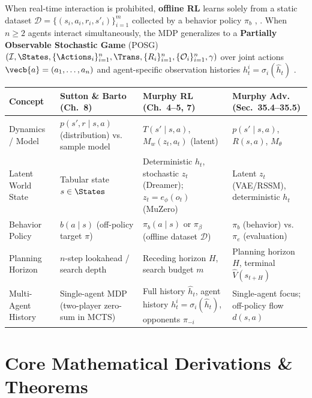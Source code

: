 \documentclass[../../../../master.tex]{subfiles}
\begin{document}
When real-time interaction is prohibited, \textbf{offline RL} learns solely from a static dataset $\mathcal{D} = \{(s_i, a_i, r_i, s'_i)\}_{i=1}^m$ collected by a behavior policy $\pi_b$ , . When $n \ge 2$ agents interact simultaneously, the MDP generalizes to a \textbf{Partially Observable Stochastic Game} (POSG) $(\mathcal{I}, \States, \{\Actions_i\}_{i=1}^n, \Trans, \{R_i\}_{i=1}^n, \{\mathcal{O}_i\}_{i=1}^n, \gamma)$ over joint actions $\vecb{a} = (a_1, \dots, a_n)$ and agent-specific observation histories $h_t^i = \sigma_i(\hat{h}_t)$ .

\begin{crossbook}
\label{tab:mbrl:notation}
\begin{tabularx}{\textwidth}{@{}l >{\raggedright\arraybackslash}X >{\raggedright\arraybackslash}X >{\raggedright\arraybackslash}X@{}}
\toprule
\textbf{Concept} & \textbf{Sutton \& Barto (Ch.~8)} & \textbf{Murphy RL (Ch.~4--5, 7)} & \textbf{Murphy Adv. (Sec.~35.4--35.5)} \\
\midrule
Dynamics / Model & $p(s', r \mid s, a)$ (distribution) vs. sample model & $T(s' \mid s, a)$, $M_w(z_t, a_t)$ (latent) & $p(s' \mid s, a)$, $R(s, a)$, $M_\theta$ \\
Latent World State & Tabular state $s \in \States$ & Deterministic $h_t$, stochastic $z_t$ (Dreamer); $z_t = e_\phi(o_t)$ (MuZero) & Latent $z_t$ (VAE/RSSM), deterministic $h_t$ \\
Behavior Policy & $b(a \mid s)$ (off-policy target $\pi$) & $\pi_b(a \mid s)$ or $\pi_\beta$ (offline dataset $\mathcal{D}$) & $\pi_b$ (behavior) vs. $\pi_e$ (evaluation) \\
Planning Horizon & $n$-step lookahead / search depth & Receding horizon $H$, search budget $m$ & Planning horizon $H$, terminal $\hat{V}(s_{t+H})$ \\
Multi-Agent History & Single-agent MDP (two-player zero-sum in MCTS) & Full history $\hat{h}_t$, agent history $h_t^i = \sigma_i(\hat{h}_t)$, opponents $\pi_{-i}$ & Single-agent focus; off-policy flow $d(s,a)$ \\
\bottomrule
\end{tabularx}
\end{crossbook}

\section{Core Mathematical Derivations \& Theorems}
\label{sec:mbrl:derivations}
\end{document}
